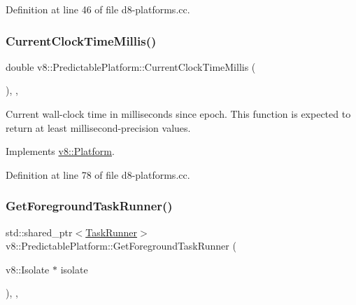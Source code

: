 Definition at line 46 of file d8-\/platforms.\+cc.

\mbox{\label{classv8_1_1PredictablePlatform_a910c1b4977cca092adec3d11b3f3b242}} 
\subsubsection{\texorpdfstring{Current\+Clock\+Time\+Millis()}{CurrentClockTimeMillis()}}
{\footnotesize\ttfamily double v8\+::\+Predictable\+Platform\+::\+Current\+Clock\+Time\+Millis (\begin{DoxyParamCaption}{ }\end{DoxyParamCaption})\hspace{0.3cm}{\ttfamily [inline]}, {\ttfamily [override]}, {\ttfamily [virtual]}}

Current wall-\/clock time in milliseconds since epoch. This function is expected to return at least millisecond-\/precision values. 

Implements \mbox{\hyperlink{classv8_1_1Platform_a8aa46c7f8e492351ebe1bc8168ec9c2f}{v8\+::\+Platform}}.



Definition at line 78 of file d8-\/platforms.\+cc.

\mbox{\label{classv8_1_1PredictablePlatform_adcf0ce1eba22ca032ed59098e60ce059}} 
\subsubsection{\texorpdfstring{Get\+Foreground\+Task\+Runner()}{GetForegroundTaskRunner()}}
{\footnotesize\ttfamily std\+::shared\+\_\+ptr$<$\mbox{\hyperlink{classv8_1_1TaskRunner}{Task\+Runner}}$>$ v8\+::\+Predictable\+Platform\+::\+Get\+Foreground\+Task\+Runner (\begin{DoxyParamCaption}\item[{v8\+::\+Isolate $\ast$}]{isolate }\end{DoxyParamCaption})\hspace{0.3cm}{\ttfamily [inline]}, {\ttfamily [override]}, {\ttfamily [virtual]}}

